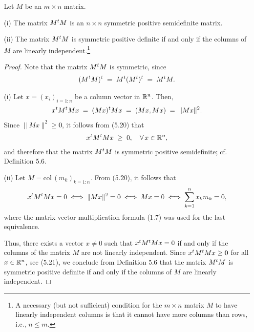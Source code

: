 
\begin{lemma}
Let $M$ be an $m \times n$ matrix.

(i) The matrix $M^{t} M$ is an $n \times n$ symmetric positive semidefinite matrix.

(ii) The matrix $M^{t} M$ is symmetric positive definite if and only if the columns of
$M$ are linearly independent.\footnote{A necessary (but not sufficient) condition for
the $m \times n$ matrix $M$ to have linearly independent columns is that it cannot
have more columns than rows, i.e., $n \leq m$.}
\end{lemma}

\begin{proof}
Note that the matrix $M^{t} M$ is symmetric, since
\[
(M^{t} M)^{t} \;=\; M^{t}(M^{t})^{t} \;=\; M^{t} M.
\]

(i) Let $x = (x_i)_{i=1:n}$ be a column vector in $\mathbb{R}^n$. Then,
\begin{equation}
x^{t} M^{t} Mx \;=\; (Mx)^{t} Mx \;=\; (Mx,Mx) \;=\; \|Mx\|^2.
\end{equation}
Since $\|Mx\|^2 \geq 0$, it follows from (5.20) that
\begin{equation}
x^{t} M^{t} Mx \;\geq\; 0, \quad \forall\, x \in \mathbb{R}^n,
\end{equation}
and therefore that the matrix $M^{t} M$ is symmetric positive semidefinite; cf.
Definition 5.6.

(ii) Let $M = \mathrm{col}\,(m_k)_{k=1:n}$. From (5.20), it follows that
\[
x^{t} M^{t} Mx = 0 \iff \|Mx\|^2 = 0 \iff Mx = 0 \iff \sum_{k=1}^{n} x_km_k = 0,
\]
where the matrix-vector multiplication formula (1.7) was used for the last
equivalence.

Thus, there exists a vector $x \neq 0$ such that $x^{t} M^{t} Mx = 0$ if and only if the
columns of the matrix $M$ are not linearly independent. Since $x^{t} M^{t} Mx \geq 0$
for all $x \in \mathbb{R}^n$, see (5.21), we conclude from Definition 5.6 that the matrix
$M^{t} M$ is symmetric positive definite if and only if the columns of $M$ are linearly
independent.
\end{proof}

